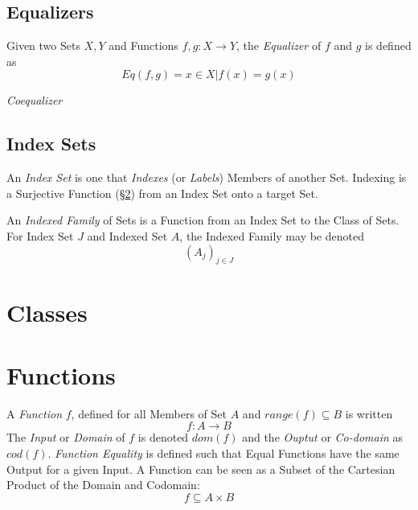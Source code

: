 \documentclass{article}
\begin{document}
\subsection{Equalizers}\label{subsec:set_equalizer}

Given two Sets $X,Y$ and Functions $f,g : X \rightarrow Y$, the
\emph{Equalizer} of $f$ and $g$ is defined as
\[
    Eq(f,g) = { x \in X | f(x) = g(x) }
\]

\emph{Coequalizer}

\subsection{Index Sets}\label{subsec:index_set}

An \emph{Index Set} is one that \emph{Indexes} (or \emph{Labels})
Members of another Set. Indexing is a Surjective Function
(\S\ref{sec:set_functions}) from an Index Set onto a target Set.

An \emph{Indexed Family} of Sets is a Function from an Index Set to
the Class of Sets. For Index Set $J$ and Indexed Set $A$, the Indexed
Family may be denoted
\[
    (A_j)_{j \in J}
\]

\section{Classes}\label{sec:classes}

\section{Functions}\label{sec:set_functions}

A \emph{Function} $f$, defined for all Members of Set $A$ and $range(f)
\subseteq B$ is written
\[
    f : A \rightarrow B
\]
The \emph{Input} or \emph{Domain} of $f$ is denoted $dom(f)$ and the
\emph{Ouptut} or \emph{Co-domain} as $cod(f)$. \emph{Function
  Equality} is defined such that Equal Functions have the same Output
for a given Input. A Function can be seen as a Subset of the Cartesian
Product of the Domain and Codomain:
\[
    f \subseteq A \times B
\]
\end{document}
